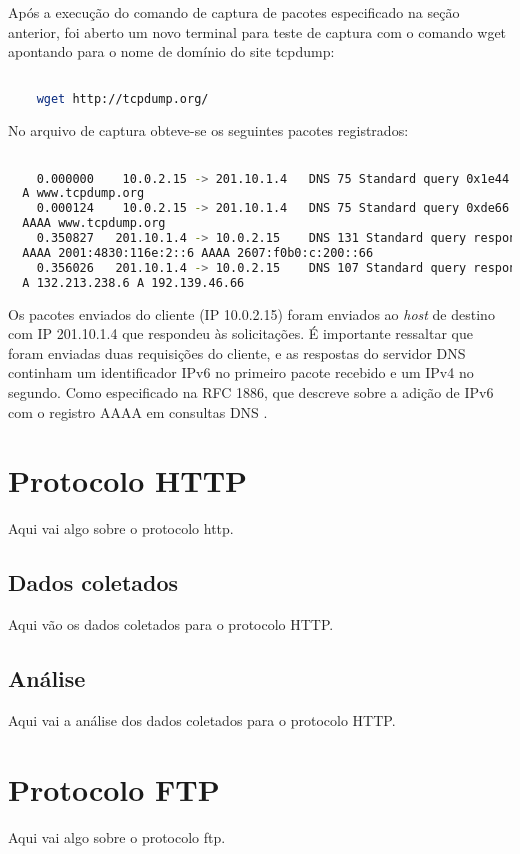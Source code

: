 \documentclass[a4paper]{report} %
\begin{document}
Após a execução do comando de captura de pacotes especificado na seção anterior, foi aberto um novo terminal para teste de captura com o comando wget apontando para o nome de domínio do site tcpdump:
\begin{lstlisting}[language=bash]

	wget http://tcpdump.org/

\end{lstlisting}

	No arquivo de captura obteve-se os seguintes pacotes registrados:

\begin{lstlisting}[language=bash]

	0.000000    10.0.2.15 -> 201.10.1.4   DNS 75 Standard query 0x1e44
  A www.tcpdump.org
	0.000124    10.0.2.15 -> 201.10.1.4   DNS 75 Standard query 0xde66
  AAAA www.tcpdump.org
	0.350827   201.10.1.4 -> 10.0.2.15    DNS 131 Standard query response 0xde66
  AAAA 2001:4830:116e:2::6 AAAA 2607:f0b0:c:200::66
	0.356026   201.10.1.4 -> 10.0.2.15    DNS 107 Standard query response 0x1e44
  A 132.213.238.6 A 192.139.46.66

\end{lstlisting}

	Os pacotes enviados do cliente (IP 10.0.2.15) foram enviados ao \textit{host} de destino com IP 201.10.1.4 que respondeu às solicitações. É importante ressaltar que foram enviadas duas requisições do cliente, e as respostas do servidor DNS continham um identificador IPv6 no primeiro pacote recebido e um IPv4 no segundo. Como especificado na RFC 1886, que descreve sobre a adição de IPv6 com o registro AAAA em consultas DNS \cite{IETF}.

\section{Protocolo HTTP}
\label{sec_http}
Aqui vai algo sobre o protocolo http.
\subsection{Dados coletados}
\label{sub_http_dados}
Aqui vão os dados coletados para o protocolo HTTP.

\subsection{Análise}
\label{sub_http_analise}
Aqui vai a análise dos dados coletados para o protocolo HTTP.

\section{Protocolo FTP}
\label{sec_ftp}
Aqui vai algo sobre o protocolo ftp.
\end{document}

